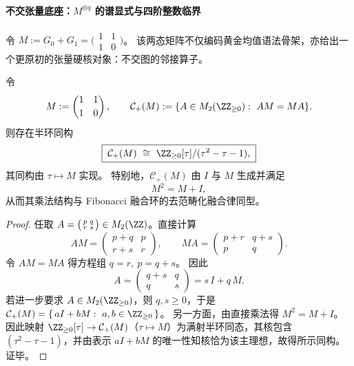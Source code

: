

\paragraph{不交张量底座：\texorpdfstring{$M^{\otimes q}$}{M^⊗q} 的谱显式与四阶整数临界}
令
\(
M:=G_0+G_1=\bigl(\begin{smallmatrix}1&1\\[2pt]1&0\end{smallmatrix}\bigr)
\)。
该两态矩阵不仅编码黄金均值语法骨架，亦给出一个更原初的张量硬核对象：不交图的邻接算子。

\begin{theorem}\label{thm:pom-centralizer-semiring-fibonacci-fusion}
令
\[
M:=\begin{pmatrix}1&1\\[2pt]1&0\end{pmatrix},
\qquad
\mathcal C_+(M):=\{A\in M_2(\ZZ_{\ge 0}):\ AM=MA\}.
\]
则存在半环同构
\[
\boxed{\;
\mathcal C_+(M)\ \cong\ \ZZ_{\ge 0}[\tau]/(\tau^2-\tau-1),\;}
\]
其同构由 \(\tau\mapsto M\) 实现。
特别地，\(\mathcal C_+(M)\) 由 \(I\) 与 \(M\) 生成并满足
\[
M^2=M+I,
\]
从而其乘法结构与 Fibonacci 融合环的去范畴化融合律同型。
\end{theorem}
\begin{proof}
任取 \(A=\bigl(\begin{smallmatrix}p&q\\ r&s\end{smallmatrix}\bigr)\in M_2(\ZZ)\)。直接计算
\[
AM=\begin{pmatrix}p+q&p\\ r+s&r\end{pmatrix},
\qquad
MA=\begin{pmatrix}p+r&q+s\\ p&q\end{pmatrix}.
\]
令 \(AM=MA\) 得方程组
\(
q=r,\ p=q+s
\)。
因此
\[
A=\begin{pmatrix}q+s&q\\ q&s\end{pmatrix}=s\,I+q\,M.
\]
若进一步要求 \(A\in M_2(\ZZ_{\ge 0})\)，则 \(q,s\ge 0\)，于是
\(
\mathcal C_+(M)=\{\,aI+bM:\ a,b\in\ZZ_{\ge 0}\,\}
\)。
另一方面，由直接乘法得 \(M^2=M+I\)。因此映射 \(\ZZ_{\ge 0}[\tau]\to\mathcal C_+(M)\)（\(\tau\mapsto M\)）为满射半环同态，其核包含 \((\tau^2-\tau-1)\)，并由表示 \(aI+bM\) 的唯一性知核恰为该主理想，故得所示同构。证毕。
\end{proof}

